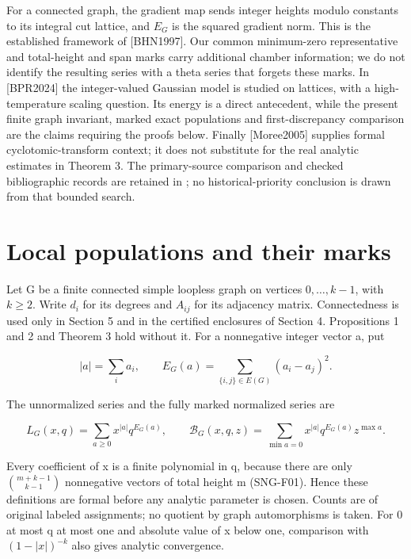 \documentclass[
  11pt,
  a4paper,
]{article}
\let\singularitytexttt\texttt
\renewcommand{\texttt}[1]{\singularitytexttt{\seqsplit{#1}}}
\begin{document}
For a connected graph, the gradient map sends integer heights modulo
constants to its integral cut lattice, and \(E_G\) is the squared
gradient norm. This is the established framework of {[}BHN1997{]}. Our
common minimum-zero representative and total-height and span marks carry
additional chamber information; we do not identify the resulting series
with a theta series that forgets these marks. In {[}BPR2024{]} the
integer-valued Gaussian model is studied on lattices, with a
high-temperature scaling question. Its energy is a direct antecedent,
while the present finite graph invariant, marked exact populations and
first-discrepancy comparison are the claims requiring the proofs below.
Finally {[}Moree2005{]} supplies formal cyclotomic-transform context; it
does not substitute for the real analytic estimates in Theorem 3. The
primary-source comparison and checked bibliographic records are retained
in \texttt{docs/papers/literature\_comparison.md}; no
historical-priority conclusion is drawn from that bounded search.

\hypertarget{local-populations-and-their-marks}{%
\section{Local populations and their
marks}\label{local-populations-and-their-marks}}

Let G be a finite connected simple loopless graph on vertices
\(0,\ldots,k-1\), with \(k\ge2\). Write \(d_i\) for its degrees and
\(A_{ij}\) for its adjacency matrix. Connectedness is used only in
Section 5 and in the certified enclosures of Section 4. Propositions 1
and 2 and Theorem 3 hold without it. For a nonnegative integer vector a,
put

\[
 |a|=\sum_i a_i,\qquad
 E_G(a)=\sum_{\{i,j\}\in E(G)}(a_i-a_j)^2.
\]

The unnormalized series and the fully marked normalized series are

\[
 L_G(x,q)=\sum_{a\ge0}x^{|a|}q^{E_G(a)},\qquad
 \mathcal B_G(x,q,z)=\sum_{\min a=0}x^{|a|}q^{E_G(a)}z^{\max a}.
\]

Every coefficient of x is a finite polynomial in q, because there are
only \(\binom{m+k-1}{k-1}\) nonnegative vectors of total height m
(SNG-F01). Hence these definitions are formal before any analytic
parameter is chosen. Counts are of original labeled assignments; no
quotient by graph automorphisms is taken. For 0 at most q at most one
and absolute value of x below one, comparison with \((1-|x|)^{-k}\) also
gives analytic convergence.
\end{document}
